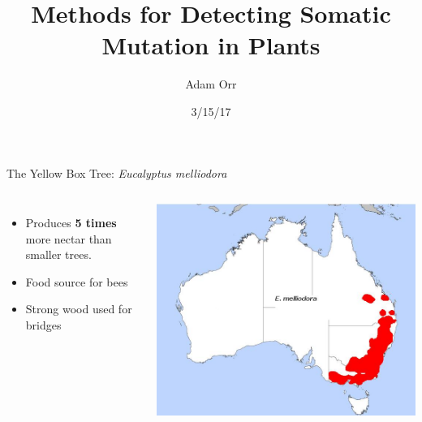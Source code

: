 \documentclass{beamer}
\title[Detecting Somatic Mutations]{Methods for Detecting Somatic Mutation in Plants}
\date{3/15/17}
\author{Adam Orr}
\begin{document}
\frame{\titlepage}
\begin{frame}{The Yellow Box Tree: \textit{Eucalyptus melliodora}}

\begin{columns}
\begin{itemize}
\item Produces \textbf{5 times} more nectar than smaller trees.
\item Food source for bees
\item Strong wood used for bridges
\end{itemize}
\includegraphics[width=\linewidth]{map.jpg}\footnotemark
\end{columns}
\end{frame}
\end{document}
